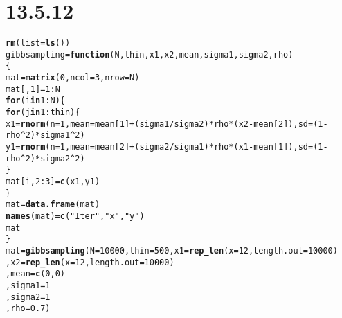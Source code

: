 \documentclass{article}\usepackage[]{graphicx}\usepackage[]{color}
\makeatletter
\newcommand{\hlnum}[1]{\textcolor[rgb]{0.686,0.059,0.569}{#1}}%
\newcommand{\hlstr}[1]{\textcolor[rgb]{0.192,0.494,0.8}{#1}}%
\newcommand{\hlopt}[1]{\textcolor[rgb]{0,0,0}{#1}}%
\newcommand{\hlstd}[1]{\textcolor[rgb]{0.345,0.345,0.345}{#1}}%
\newcommand{\hlkwa}[1]{\textcolor[rgb]{0.161,0.373,0.58}{\textbf{#1}}}%
\newcommand{\hlkwb}[1]{\textcolor[rgb]{0.69,0.353,0.396}{#1}}%
\newcommand{\hlkwc}[1]{\textcolor[rgb]{0.333,0.667,0.333}{#1}}%
\newcommand{\hlkwd}[1]{\textcolor[rgb]{0.737,0.353,0.396}{\textbf{#1}}}%
\newenvironment{kframe}{%
 \def\at@end@of@kframe{}%
 \ifinner\ifhmode%
  \def\at@end@of@kframe{\end{minipage}}%
  \begin{minipage}{\columnwidth}%
 \fi\fi%
 \def\FrameCommand##1{\hskip\@totalleftmargin \hskip-\fboxsep
 \colorbox{shadecolor}{##1}\hskip-\fboxsep
     \hskip-\linewidth \hskip-\@totalleftmargin \hskip\columnwidth}%
 \MakeFramed {\advance\hsize-\width
   \@totalleftmargin\z@ \linewidth\hsize
   \@setminipage}}%
 {\par\unskip\endMakeFramed%
 \at@end@of@kframe}
\newenvironment{knitrout}{}{} %
\makeatother
\begin{document}
\section{13.5.12}
\begin{knitrout}
\color{fgcolor}\begin{kframe}
\begin{alltt}
\hlkwd{rm}\hlstd{(}\hlkwc{list}\hlstd{=}\hlkwd{ls}\hlstd{())}
  \hlstd{gibbsampling}\hlkwb{=}\hlkwa{function}\hlstd{(}\hlkwc{N}\hlstd{,}\hlkwc{thin}\hlstd{,}\hlkwc{x1}\hlstd{,}\hlkwc{x2}\hlstd{,}\hlkwc{mean}\hlstd{,}\hlkwc{sigma1}\hlstd{,}\hlkwc{sigma2}\hlstd{,}\hlkwc{rho}\hlstd{)}
  \hlstd{\{}
    \hlstd{mat}\hlkwb{=}\hlkwd{matrix}\hlstd{(}\hlnum{0}\hlstd{,}\hlkwc{ncol}\hlstd{=}\hlnum{3}\hlstd{,}\hlkwc{nrow}\hlstd{=N)}
    \hlstd{mat[,}\hlnum{1}\hlstd{]}\hlkwb{=}\hlnum{1}\hlopt{:}\hlstd{N}
    \hlkwa{for} \hlstd{(i} \hlkwa{in} \hlnum{1}\hlopt{:}\hlstd{N) \{}
      \hlkwa{for} \hlstd{(j} \hlkwa{in} \hlnum{1}\hlopt{:}\hlstd{thin) \{}
        \hlstd{x1}\hlkwb{=}\hlkwd{rnorm}\hlstd{(}\hlkwc{n}\hlstd{=}\hlnum{1}\hlstd{,} \hlkwc{mean} \hlstd{= mean[}\hlnum{1}\hlstd{]}\hlopt{+}\hlstd{(sigma1}\hlopt{/}\hlstd{sigma2)}\hlopt{*}\hlstd{rho}\hlopt{*}\hlstd{(x2}\hlopt{-}\hlstd{mean[}\hlnum{2}\hlstd{]),} \hlkwc{sd} \hlstd{= (}\hlnum{1}\hlopt{-}\hlstd{rho}\hlopt{^}\hlnum{2}\hlstd{)}\hlopt{*}\hlstd{sigma1}\hlopt{^}\hlnum{2}\hlstd{)}
        \hlstd{y1}\hlkwb{=}\hlkwd{rnorm}\hlstd{(}\hlkwc{n}\hlstd{=}\hlnum{1}\hlstd{,} \hlkwc{mean} \hlstd{= mean[}\hlnum{2}\hlstd{]}\hlopt{+}\hlstd{(sigma2}\hlopt{/}\hlstd{sigma1)}\hlopt{*}\hlstd{rho}\hlopt{*}\hlstd{(x1}\hlopt{-}\hlstd{mean[}\hlnum{1}\hlstd{]),} \hlkwc{sd} \hlstd{= (}\hlnum{1}\hlopt{-}\hlstd{rho}\hlopt{^}\hlnum{2}\hlstd{)}\hlopt{*}\hlstd{sigma2}\hlopt{^}\hlnum{2}\hlstd{)}
      \hlstd{\}}
      \hlstd{mat[i,}\hlnum{2}\hlopt{:}\hlnum{3}\hlstd{]}\hlkwb{=}\hlkwd{c}\hlstd{(x1,y1)}
    \hlstd{\}}
    \hlstd{mat}\hlkwb{=}\hlkwd{data.frame}\hlstd{(mat)}
    \hlkwd{names}\hlstd{(mat)}\hlkwb{=}\hlkwd{c}\hlstd{(}\hlstr{"Iter"}\hlstd{,}\hlstr{"x"}\hlstd{,}\hlstr{"y"}\hlstd{)}
    \hlstd{mat}
  \hlstd{\}}
  \hlstd{mat}\hlkwb{=}\hlkwd{gibbsampling}\hlstd{(}\hlkwc{N}\hlstd{=}\hlnum{10000}\hlstd{,}\hlkwc{thin}\hlstd{=}\hlnum{500}\hlstd{,}\hlkwc{x1}\hlstd{=}\hlkwd{rep_len}\hlstd{(}\hlkwc{x}\hlstd{=}\hlnum{12}\hlstd{,} \hlkwc{length.out}\hlstd{=}\hlnum{10000}\hlstd{)}
                   \hlstd{,}\hlkwc{x2}\hlstd{=}\hlkwd{rep_len}\hlstd{(}\hlkwc{x}\hlstd{=}\hlnum{12}\hlstd{,} \hlkwc{length.out}\hlstd{=}\hlnum{10000}\hlstd{)}
                   \hlstd{,}\hlkwc{mean}\hlstd{=}\hlkwd{c}\hlstd{(}\hlnum{0}\hlstd{,}\hlnum{0}\hlstd{)}
                   \hlstd{,}\hlkwc{sigma1}\hlstd{=}\hlnum{1}
                   \hlstd{,}\hlkwc{sigma2}\hlstd{=}\hlnum{1}
                   \hlstd{,}\hlkwc{rho}\hlstd{=}\hlnum{0.7}\hlstd{)}


\end{alltt}
\end{kframe}
\end{knitrout}
\end{document}
